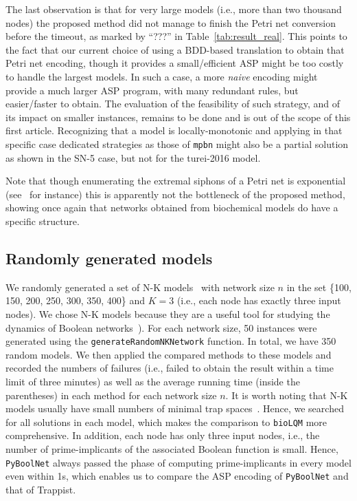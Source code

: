 \documentclass[preprint,12pt]{elsarticle}
\begin{document}
The last observation is that for very large models (i.e., more than two thousand nodes) the proposed method did not manage to finish the Petri net conversion before the timeout, as marked by ``???'' in Table~\ref{tab:result_real}.
This points to the fact that our current choice of using a BDD-based translation to obtain that Petri net encoding, though it provides a small/efficient ASP might be too costly to handle the largest models.
In such a case, a more \emph{naive} encoding might provide a much larger ASP program, with many redundant rules, but easier/faster to obtain.
The evaluation of the feasibility of such strategy, and of its impact on smaller instances, remains to be done and is out of the scope of this first article.
Recognizing that a model is locally-monotonic and applying in that specific case dedicated strategies as those of \texttt{mpbn} might also be a partial solution as shown in the SN-5 case, but not for the turei-2016 model.

Note that though enumerating the extremal siphons of a Petri net is exponential (see~\cite{nabli2016enumerating} for instance) this is apparently not the bottleneck of the proposed method, showing once again that networks obtained from biochemical models do have a specific structure.

\subsection{Randomly generated models}

We randomly generated a set of N-K models~\cite{glass1973logical} with network size \(n\) in the set \{100, 150, 200, 250, 300, 350, 400\} and \(K = 3\) (i.e., each node has exactly three input nodes).
We chose N-K models because they are a useful tool for studying the dynamics of Boolean networks~\cite{glass1973logical,klarner2015computing}).
For each network size, 50 instances were generated using the \verb|generateRandomNKNetwork| function.
In total, we have 350 random models. 
We then applied the compared methods to these models and recorded the numbers of failures (i.e., failed to obtain the result within a time limit of three minutes) as well as the average running time (inside the parentheses) in each method for each network size \(n\).
It is worth noting that N-K models usually have small numbers of minimal trap spaces~\cite{klarner2015computing}.
Hence, we searched for all solutions in each model, which makes the comparison to \texttt{bioLQM} more comprehensive.
In addition, each node has only three input nodes, i.e., the number of prime-implicants of the associated Boolean function is small.
Hence, \texttt{PyBoolNet} always passed the phase of computing prime-implicants in every model even within 1s, which enables us to compare the ASP encoding of \texttt{PyBoolNet} and that of Trappist.
\end{document}
